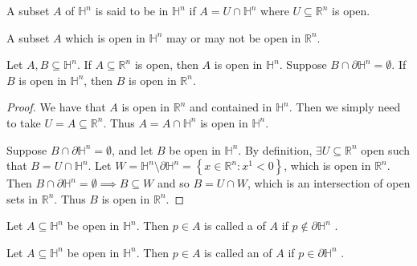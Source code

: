 \documentclass[notoc,notitlepage]{tufte-book}
\begin{document}
\begin{defn}\label{defn:open_subset_in_a_half_space}
  A subset $A$ of $\mathbb{H}^n$ is said to be  in $\mathbb{H}^n$ if $A = U
  \cap \mathbb{H}^n$ where $U \subseteq \mathbb{R}^n$ is open.
\end{defn}

\begin{note}
  A subset $A$ which is open in $\mathbb{H}^n$ may or may not be open in
  $\mathbb{R}^n$.
\end{note}

\begin{lemma}\label{lemma:characterization_of_open_sets_in_a_half_space}
  Let $A, B \subseteq \mathbb{H}^n$. If $A \subseteq \mathbb{R}^n$ is open, then
  $A$ is open in $\mathbb{H}^n$. Suppose $B \cap \partial \mathbb{H}^n =
  \emptyset$. If $B$ is open in $\mathbb{H}^n$, then $B$ is open in
  $\mathbb{R}^n$.
\end{lemma}

\begin{proof}
  We have that $A$ is open in $\mathbb{R}^n$ and contained in $\mathbb{H}^n$.
  Then we simply need to take $U = A \subseteq \mathbb{R}^n$. Thus $A = A \cap
  \mathbb{H}^n$ is open in $\mathbb{H}^n$.

  Suppose $B \cap \partial \mathbb{H}^n = \emptyset$, and let $B$ be open in
  $\mathbb{H}^n$. By definition, $\exists U \subseteq \mathbb{R}^n$ open such that $B = U
  \cap \mathbb{H}^n$. Let $W = \mathbb{H}^n \setminus \partial \mathbb{H}^n =
  \left\{ x \in \mathbb{R}^n : x^1 < 0 \right\}$,
  which is open in $\mathbb{R}^n$. Then $B \cap \partial \mathbb{H}^n =
  \emptyset \implies B \subseteq W$ and so $B = U \cap W$, which is an
  intersection of open sets in $\mathbb{R}^n$. Thus $B$ is open in
  $\mathbb{R}^n$.
\end{proof}

\begin{defn}\label{defn:interior_point_in_the_half_space}
  Let $A \subseteq \mathbb{H}^n$ be open in $\mathbb{H}^n$. Then $p \in A$ is
  called a  of $A$ if $p \notin \partial \mathbb{H}^n$
  .
\end{defn}

\begin{defn}\label{defn:boundary_point_in_the_half_space}
  Let $A \subseteq \mathbb{H}^n$ be open in $\mathbb{H}^n$. Then $p \in A$ is
  called an  of $A$ if $p \in \partial \mathbb{H}^n$
  .
\end{defn}
\end{document}
